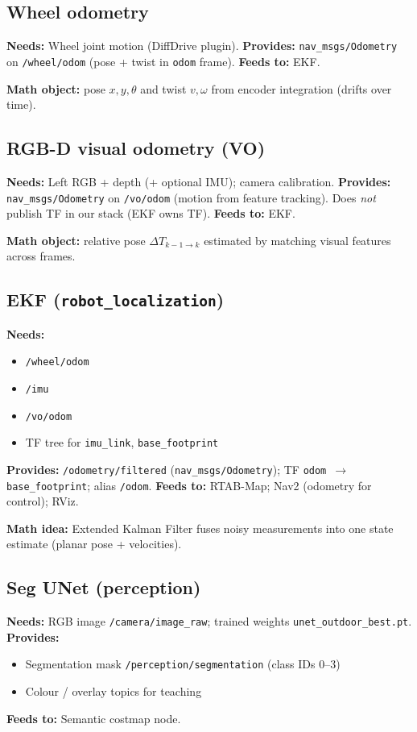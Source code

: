 \documentclass[11pt,a4paper]{article}
\newcommand{\needs}[1]{\textbf{Needs:} #1}
\newcommand{\provides}[1]{\textbf{Provides:} #1}
\newcommand{\feeds}[1]{\textbf{Feeds to:} #1}
\begin{document}
\subsection{Wheel odometry}
\needs{Wheel joint motion (DiffDrive plugin).}
\provides{\texttt{nav\_msgs/Odometry} on \texttt{/wheel/odom} (pose + twist in \texttt{odom} frame).}
\feeds{EKF.}

\textbf{Math object:} pose $x,y,\theta$ and twist $v,\omega$ from encoder integration (drifts over time).

\subsection{RGB-D visual odometry (VO)}
\needs{Left RGB + depth (+ optional IMU); camera calibration.}
\provides{\texttt{nav\_msgs/Odometry} on \texttt{/vo/odom} (motion from feature tracking). Does \emph{not} publish TF in our stack (EKF owns TF).}
\feeds{EKF.}

\textbf{Math object:} relative pose $\Delta T_{k-1\rightarrow k}$ estimated by matching visual features across frames.

\subsection{EKF (\texttt{robot\_localization})}
\needs{
\begin{itemize}[nosep,leftmargin=*]
  \item \texttt{/wheel/odom}
  \item \texttt{/imu}
  \item \texttt{/vo/odom}
  \item TF tree for \texttt{imu\_link}, \texttt{base\_footprint}
\end{itemize}}
\provides{\texttt{/odometry/filtered} (\texttt{nav\_msgs/Odometry}); TF \texttt{odom $\rightarrow$ base\_footprint}; alias \texttt{/odom}.}
\feeds{RTAB-Map; Nav2 (odometry for control); RViz.}

\textbf{Math idea:} Extended Kalman Filter fuses noisy measurements into one state estimate (planar pose + velocities).

\subsection{Seg UNet (perception)}
\needs{RGB image \texttt{/camera/image\_raw}; trained weights \texttt{unet\_outdoor\_best.pt}.}
\provides{
\begin{itemize}[nosep,leftmargin=*]
  \item Segmentation mask \texttt{/perception/segmentation} (class IDs 0--3)
  \item Colour / overlay topics for teaching
\end{itemize}}
\feeds{Semantic costmap node.}
\end{document}
